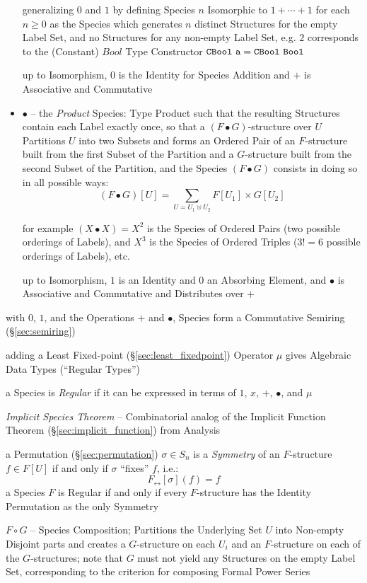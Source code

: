 \begin{itemize}
    generalizing $0$ and $1$ by defining Species $n$ Isomorphic to $1 + \cdots +
    1$ for each $n \geq 0$ as the Species which generates $n$ distinct
    Structures for the empty Label Set, and no Structures for any non-empty
    Label Set, e.g. $2$ corresponds to the (Constant) $Bool$ Type Constructor
    $\mono{CBool\ a = CBool\ Bool}$

    up to Isomorphism, $0$ is the Identity for Species Addition and $+$ is
    Associative and Commutative
  \item $\bullet$ -- the \emph{Product} Species: Type Product such that the
    resulting Structures contain each Label exactly once, so that a $(F \bullet
    G)$-structure over $U$ Partitions $U$ into two Subsets and forms an Ordered
    Pair of an $F$-structure built from the first Subset of the Partition and
    a $G$-structure built from the second Subset of the Partition, and the
    Species $(F \bullet G)$ consists in doing so in all possible ways:
    \[
      (F \bullet G)[U] = \sum_{U = U_1 \uplus U_2} F[U_1] \times G[U_2]
    \]

    for example $(X \bullet X) = X^2$ is the Species of Ordered Pairs (two
    possible orderings of Labels), and $X^3$ is the Species of Ordered Triples
    ($3! = 6$ possible orderings of Labels), etc.

    up to Isomorphism, $1$ is an Identity and $0$ an Absorbing Element, and
    $\bullet$ is Associative and Commutative and Distributes over $+$
\end{itemize}

with $0$, $1$, and the Operations $+$ and $\bullet$, Species form a Commutative
Semiring (\S\ref{sec:semiring})

adding a Least Fixed-point (\S\ref{sec:least_fixedpoint}) Operator $\mu$ gives
Algebraic Data Types (``Regular Types'')

a Species is \emph{Regular} if it can be expressed in terms of $1$, $x$, $+$,
$\bullet$, and $\mu$

\emph{Implicit Species Theorem} -- Combinatorial analog of the Implicit Function
Theorem (\S\ref{sec:implicit_function}) from Analysis

a Permutation (\S\ref{sec:permutation}) $\sigma \in S_n$ is a \emph{Symmetry} of
an $F$-structure $f \in F[U]$ if and only if $\sigma$ ``fixes'' $f$, i.e.:
\[
  F_\leftrightarrow[\sigma](f) = f
\]
a Species $F$ is Regular if and only if every $F$-structure has the Identity
Permutation as the only Symmetry

$F \circ G$ -- Species Composition; Partitions the Underlying Set $U$ into
Non-empty Disjoint parts and creates a $G$-structure on each $U_i$ and an
$F$-structure on each of the $G$-structures; note that $G$ must not yield any
Structures on the empty Label Set, corresponding to the criterion for composing
Formal Power Series

